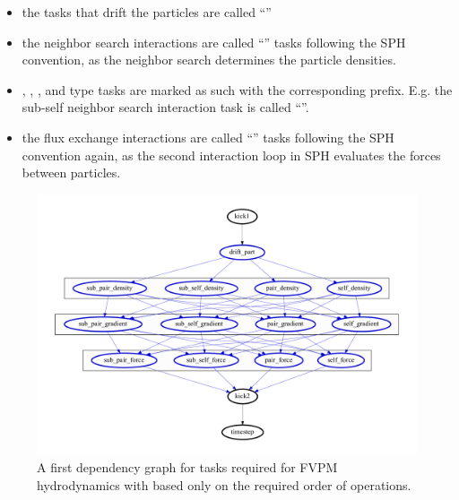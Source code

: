 \begin{itemize}
\item the tasks that drift the particles are called ``''
\item the neighbor search interactions are called ``'' tasks following the SPH
convention, as the neighbor search determines the particle densities.
\item {}, , , and  type tasks are marked as
such with the corresponding prefix. E.g. the sub-self neighbor search interaction task is called
``''.
\item the flux exchange interactions are called ``'' tasks following
the SPH convention again, as the second interaction loop in SPH evaluates the forces between
particles.
\end{itemize}


\begin{figure}
\centering
\includegraphics[width=\linewidth]{figures/Meshless/tasks_hydro_zeroth_order.pdf}%
\caption{
A first dependency graph for tasks required for FVPM hydrodynamics with \swift based only on the
required order of operations.
}
\label{fig:dependency-graph-zeroth-order}
\end{figure}


